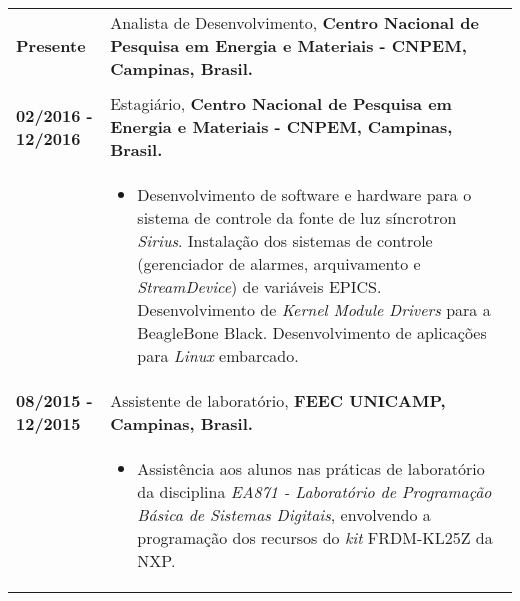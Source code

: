 \documentclass[10pt, a4paper]{article}
\begin{document}
\begin{tabular}{p{} p{}}


\textbf{Presente}  & Analista de Desenvolvimento, \textbf{Centro Nacional de
Pesquisa em Energia e Materiais - CNPEM, Campinas, Brasil.}
\\
& \vspace{-12pt}
\\

\textbf{02/2016 - 12/2016}  & Estagiário, \textbf{Centro Nacional de Pesquisa em
Energia e Materiais - CNPEM, Campinas, Brasil.}
\\
& \vspace{-12pt}
\begin{itemize}
  \item Desenvolvimento de software e hardware para o sistema de controle da
  fonte de luz síncrotron \textit{Sirius}. Instalação dos sistemas de
  controle (gerenciador de alarmes, arquivamento e \textit{StreamDevice}) de variáveis EPICS. Desenvolvimento de
  \textit{Kernel Module Drivers} para a BeagleBone Black. Desenvolvimento
  de aplicações para \textit{Linux} embarcado.
  
\end{itemize}\\


\textbf{08/2015 - 12/2015}  & Assistente de laboratório, \textbf{FEEC
UNICAMP, Campinas, Brasil.}
\\
& \vspace{-12pt}
\begin{itemize}
  \item Assistência aos alunos nas práticas de laboratório da
  disciplina \textit{EA871 - Laboratório de Programação Básica de Sistemas
  Digitais}, envolvendo a programação dos recursos do \textit{kit} FRDM-KL25Z
  da NXP.
  
\end{itemize}\\



\end{tabular}
\end{document}

